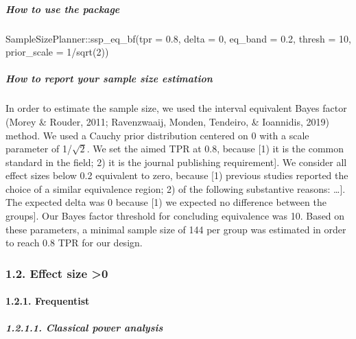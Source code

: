 \documentclass[
  english,
  man,floatsintext]{apa6}
\newenvironment{Shaded}{\begin{snugshade}}{\end{snugshade}}
\newcommand{\AttributeTok}[1]{\textcolor[rgb]{0.77,0.63,0.00}{#1}}
\newcommand{\DecValTok}[1]{\textcolor[rgb]{0.00,0.00,0.81}{#1}}
\newcommand{\FloatTok}[1]{\textcolor[rgb]{0.00,0.00,0.81}{#1}}
\newcommand{\FunctionTok}[1]{\textcolor[rgb]{0.00,0.00,0.00}{#1}}
\newcommand{\NormalTok}[1]{#1}
\newcommand{\SpecialCharTok}[1]{\textcolor[rgb]{0.00,0.00,0.00}{#1}}
\let\oldparagraph\paragraph
\renewcommand{\paragraph}[1]{\oldparagraph{#1}\mbox{}}
\let\oldsubparagraph\subparagraph
\renewcommand{\subparagraph}[1]{\oldsubparagraph{#1}\mbox{}}
\begin{document}
\hypertarget{how-to-use-the-package-1}{%
\subparagraph{How to use the package}\label{how-to-use-the-package-1}}

\begin{Shaded}
\begin{Highlighting}[]
\NormalTok{SampleSizePlanner}\SpecialCharTok{::}\FunctionTok{ssp\_eq\_bf}\NormalTok{(}\AttributeTok{tpr =} \FloatTok{0.8}\NormalTok{, }\AttributeTok{delta =} \DecValTok{0}\NormalTok{, }\AttributeTok{eq\_band =} \FloatTok{0.2}\NormalTok{,}
    \AttributeTok{thresh =} \DecValTok{10}\NormalTok{, }\AttributeTok{prior\_scale =} \DecValTok{1}\SpecialCharTok{/}\FunctionTok{sqrt}\NormalTok{(}\DecValTok{2}\NormalTok{))}
\end{Highlighting}
\end{Shaded}

\hypertarget{how-to-report-your-sample-size-estimation-1}{%
\subparagraph{How to report your sample size estimation}\label{how-to-report-your-sample-size-estimation-1}}

In order to estimate the sample size, we used the interval equivalent Bayes factor (Morey \& Rouder, 2011; Ravenzwaaij, Monden, Tendeiro, \& Ioannidis, 2019) method. We used a Cauchy prior distribution centered on 0 with a scale parameter of 1/\(\sqrt{2}\). We set the aimed TPR at 0.8, because {[}1) it is the common standard in the field; 2) it is the journal publishing requirement{]}. We consider all effect sizes below 0.2 equivalent to zero, because {[}1) previous studies reported the choice of a similar equivalence region; 2) of the following substantive reasons: \ldots{]}. The expected delta was 0 because {[}1) we expected no difference between the groups{]}. Our Bayes factor threshold for concluding equivalence was 10. Based on these parameters, a minimal sample size of 144 per group was estimated in order to reach 0.8 TPR for our design.

\hypertarget{effect-size-0-1}{%
\subsubsection{1.2. Effect size \textgreater0}\label{effect-size-0-1}}

\hypertarget{frequentist}{%
\paragraph{1.2.1. Frequentist}\label{frequentist}}

\hypertarget{classical-power-analysis}{%
\subparagraph{1.2.1.1. Classical power analysis}\label{classical-power-analysis}}
\end{document}
